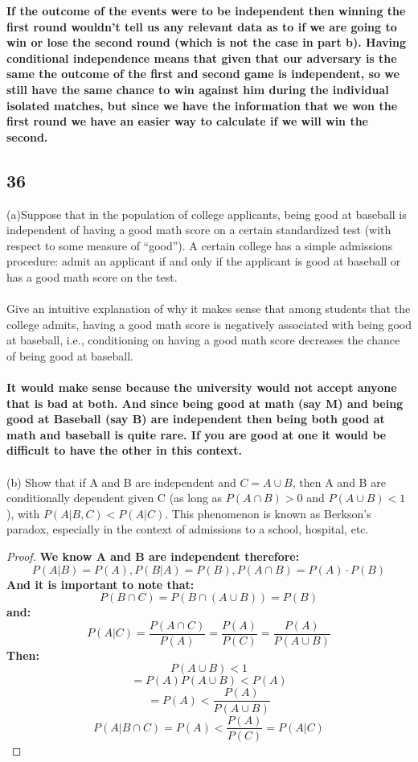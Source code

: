 \documentclass{article}
\begin{document}
\textbf{If the outcome of the events were to be independent then winning the first round wouldn't tell us any relevant data as to if we are going to win or lose the second round (which is not the case in part b). Having conditional independence means that given that our adversary is the same the outcome of the first and second game is independent, so we still have the same chance to win against him during the individual isolated matches, but since we have the information that we won the first round we have an easier way to calculate if we will win the second.}

\subsection{36}(a)Suppose that in the population of college applicants, being good at baseball is independent of having a good math score on a certain standardized test (with respect to some measure of “good”). A certain college has a simple admissions procedure: admit an applicant if and only if the applicant is good at baseball or has a good math score on the test.\\\\
Give an intuitive explanation of why it makes sense that among students that the college admits, having a good math score is negatively associated with being good at baseball, i.e., conditioning on having a good math score decreases the chance of being good at baseball. \\\\
\textbf{It would make sense because the university would not accept anyone that is bad at both. And since being good at math (say M) and being good at Baseball (say B) are independent then being both good at math and baseball is quite rare. If you are good at one it would be difficult to have the other in this context.} \\\\
(b) Show that if A and B are independent and $C = A\cup B$, then A and B are conditionally dependent given C (as long as $P(A \cap B) > 0$ and $P(A\cup B) < 1$), with
$P (A|B, C) < P (A|C)$.
This phenomenon is known as Berkson’s paradox, especially in the context of admissions
to a school, hospital, etc.
\begin{proof}
    \textbf{We know A and B are independent therefore:}
$$P(A|B)=P(A), P(B|A)=P(B), P(A \cap B)= P(A) \cdot P(B)$$
\textbf{And it is important to note that:}
$$P(B \cap C)= P(B \cap (A \cup B))=P(B)$$
\textbf{and:}
$$P(A|C)=\frac{P(A \cap C)}{P(A)}=\frac{P(A)}{P(C)}=\frac{P(A)}{P(A \cup B)}$$
\textbf{Then:}
$$P(A \cup B)<1$$
$$=P(A)P(A \cup B)<P(A)$$
$$=P(A)< \frac{P(A)}{P(A \cup B)}$$
$$P(A|B \cap  C)=P(A)< \frac{P(A)}{P(C)}=P(A|C)$$
\end{proof}
\end{document}
